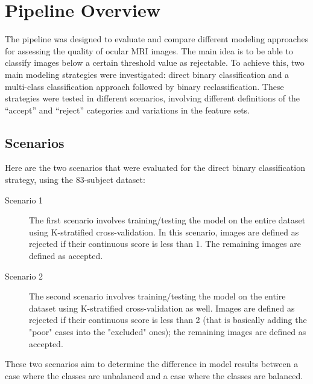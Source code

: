 

\section{Pipeline Overview}
\label{sec:pipeline_overview}
The pipeline was designed to evaluate and compare different modeling approaches for assessing the quality of ocular MRI images. The main idea is to be able to classify images below a certain threshold value as rejectable. To achieve this, two main modeling strategies were investigated: direct binary classification and a multi-class classification approach followed by binary reclassification. These strategies were tested in different scenarios, involving different definitions of the “accept” and “reject” categories and variations in the feature sets.

\subsection{Scenarios}
\label{ssec:scenarios_methods} %

Here are the two scenarios that were evaluated for the direct binary classification strategy, using the 83-subject dataset:
\begin{description}
    \item[Scenario 1] The first scenario involves training/testing the model on the entire dataset using K-stratified cross-validation. In this scenario, images are defined as rejected if their continuous score is less than 1. The remaining images are defined as accepted.
    \item[Scenario 2] The second scenario involves training/testing the model on the entire dataset using K-stratified cross-validation as well. Images are defined as rejected if their continuous score is less than 2 (that is basically adding the "poor" cases into the "excluded" ones); the remaining images are defined as accepted.
\end{description}
These two scenarios aim to determine the difference in model results between a case where the classes are unbalanced and a case where the classes are balanced.

